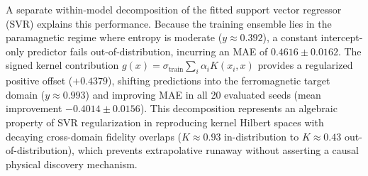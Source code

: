 A separate within-model decomposition of the fitted support vector regressor (SVR) explains this performance. Because the training ensemble lies in the paramagnetic regime where entropy is moderate ($y \approx 0.392$), a constant intercept-only predictor fails out-of-distribution, incurring an MAE of $0.4616 \pm 0.0162$. The signed kernel contribution $g(x) = \sigma_{\text{train}} \sum_{i} \alpha_i K(x_i, x)$ provides a regularized positive offset ($+0.4379$), shifting predictions into the ferromagnetic target domain ($y \approx 0.993$) and improving MAE in all 20 evaluated seeds (mean improvement $-0.4014 \pm 0.0156$). This decomposition represents an algebraic property of SVR regularization in reproducing kernel Hilbert spaces with decaying cross-domain fidelity overlaps ($K \approx 0.93$ in-distribution to $K \approx 0.43$ out-of-distribution), which prevents extrapolative runaway without asserting a causal physical discovery mechanism.
